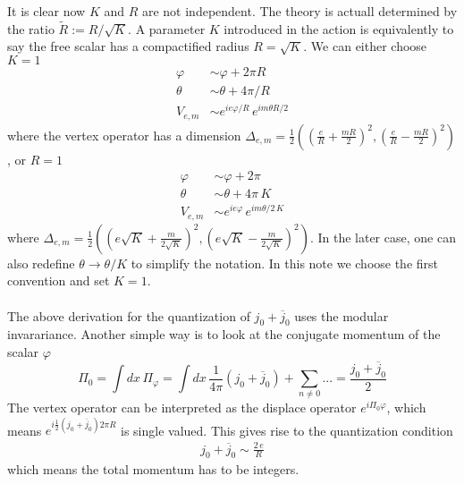 It is clear now $K$ and $R$ are not independent. The theory is actuall determined by the ratio $\tilde{R} := R/\sqrt{K}$. A parameter $K$ introduced in the action is equivalently to say the free scalar has a compactified radius $R = \sqrt{K}$. We can either choose $K=1$
\begin{equation}
	\begin{aligned}
		\varphi &\sim \varphi + 2\pi R \\
		\theta &\sim \theta + 4\pi/R \\
		V_{e,m} &\sim e^{ie\varphi/R}\,e^{im\theta R/2}
	\end{aligned}
\end{equation}
where the vertex operator has a dimension $\Delta_{e,m} = \frac{1}{2}\left(\left(\frac{e}{R}+\frac{mR}{2}\right)^2,\left(\frac{e}{R}-\frac{mR}{2}\right)^2\right)$, or $R=1$
\begin{equation}
	\begin{aligned}
		\varphi &\sim \varphi + 2\pi \\
		\theta &\sim \theta + 4\pi\,K \\
		V_{e,m} &\sim e^{ie\varphi}\,e^{im\theta/2\,K}
	\end{aligned}
\end{equation}
where $\Delta_{e,m} = \frac{1}{2}\left(\left(e\sqrt{K}+\frac{m}{2\sqrt{K}}\right)^2,\left(e\sqrt{K}-\frac{m}{2\sqrt{K}}\right)^2\right)$. In the later case, one can also redefine $\theta \rightarrow \theta / K$ to simplify the notation. In this note we choose the first convention and set $K=1$. \\

 \\
 The above derivation for the quantization of $j_0 + \overline{j}_0$ uses the modular invarariance. Another simple way is to look at the conjugate momentum of the scalar $\varphi$
 \begin{equation}
	\Pi_0 = \int dx \, \Pi_\varphi = \int dx \, \frac{1}{4\pi} \left(j_0 + \overline{j}_0\right) + \sum_{n\neq0}... = \frac{j_0+\overline{j}_0}{2}
 \end{equation} 
The vertex operator can be interpreted as the displace operator $e^{i\Pi_0 \varphi}$, which means $e^{i\frac{1}{2}\left(j_0+\overline{j}_0\right)2\pi R}$ is single valued. This gives rise to the quantization condition
\begin{equation}
	\begin{aligned}
		j_0 + \overline{j}_0 \sim \frac{2\,e}{R}
	\end{aligned}
\end{equation}
which means the total momentum has to be integers.

